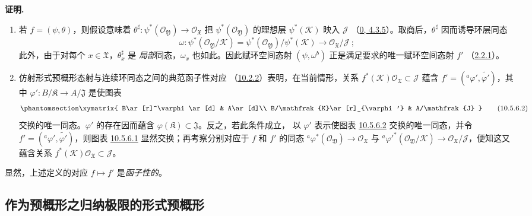 \documentclass[UTF8,fontset=none,11pt,oneside,openany]{ctexbook}
\newenvironment{proof}{%
  \par\medskip\noindent\textbf{证明.}\ %
}{\par}
\let\EGAOriginalLabel\label
\renewcommand{\label}[1]{\phantomsection\EGAOriginalLabel{#1}}
\begin{document}
\begin{proof}
\medskip\noindent
\begin{enumerate}
  \item[\rm{(i)}] 若 $f=(\psi,\theta)$，则假设意味着
    $\theta^\sharp:\psi^*(\mathscr{O}_{\mathfrak{Y}})\to
    \mathscr{O}_{\mathfrak{X}}$ 把
    $\psi^*(\mathscr{O}_{\mathfrak{Y}})$ 的理想层
    $\psi^*(\mathscr{K})$ 映入 $\mathscr{J}$
    （\hyperref[0.4.3.5-fr]{0, 4.3.5}）。取商后，$\theta^\sharp$
    因而诱导环层同态
    \[
      \omega:\psi^*(\mathscr{O}_{\mathfrak{Y}}/\mathscr{K})
      =\psi^*(\mathscr{O}_{\mathfrak{Y}})/\psi^*(\mathscr{K})
      \to\mathscr{O}_{\mathfrak{X}}/\mathscr{J}~;
    \]
    此外，由于对每个 $x\in\mathfrak{X}$，$\theta_x^\sharp$ 是
    \emph{局部}同态，$\omega_x$ 也如此。因此赋环空间态射
    $(\psi,\omega^b)$ 正是满足要求的唯一赋环空间态射 $f'$
    （\hyperref[I.2.2.1-fr]{2.2.1}）。
  \item[\rm{(ii)}] 仿射形式预概形态射与连续环同态之间的典范函子性对应
    （\hyperref[I.10.2.2-fr]{10.2.2}）表明，在当前情形，关系
    $f^*(\mathscr{K})\mathscr{O}_{\mathfrak{X}}\subset\mathscr{J}$
    蕴含 $f'=({}^a\varphi',\widetilde{\varphi'})$，其中
    $\varphi':B/\mathfrak{K}\to A/\mathfrak{J}$ 是使图表
    \[
      \label{I.10.5.6.2-fr}
      \xymatrix{
        B\ar[r]^\varphi\ar[d] & A\ar[d]\\
        B/\mathfrak{K}\ar[r]_{\varphi'} & A/\mathfrak{J}
      }
      \tag{10.5.6.2}
    \]
    交换的唯一同态。$\varphi'$ 的存在因而蕴含
    $\varphi(\mathfrak{K})\subset\mathfrak{J}$。反之，若此条件成立，
    以 $\varphi'$ 表示使图表
    \hyperref[I.10.5.6.2-fr]{10.5.6.2} 交换的唯一同态，并令
    $f'=({}^a\varphi',\widetilde{\varphi'})$，则图表
    \hyperref[I.10.5.6.1-fr]{10.5.6.1} 显然交换；再考察分别对应于
    $f$ 和 $f'$ 的同态
    ${}^a\varphi^*(\mathscr{O}_{\mathfrak{Y}})\to
    \mathscr{O}_{\mathfrak{X}}$ 与
    ${}^a{\varphi'}^*(\mathscr{O}_{\mathfrak{Y}}/\mathscr{K})\to
    \mathscr{O}_{\mathfrak{X}}/\mathscr{J}$，便知这又蕴含关系
    $f^*(\mathscr{K})\mathscr{O}_{\mathfrak{X}}\subset\mathscr{J}$。
\end{enumerate}
\end{proof}

显然，上述定义的对应 $f\mapsto f'$ 是\emph{函子性的}。

\subsection{作为预概形之归纳极限的形式预概形}
\label{subsection:I.10.6-fr}
\end{document}
